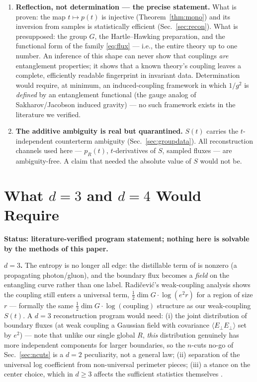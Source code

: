 \documentclass[11pt]{article}
\theoremstyle{remark}
\theoremstyle{plain}
\newcommand{\dG}{\dim G}
\begin{document}
\begin{enumerate}
\item \textbf{Reflection, not determination --- the precise statement.} What is proven: the map $t \mapsto p(t)$ is injective (Theorem~\ref{thm:mono}) and its inversion from samples is statistically efficient (Sec.~\ref{sec:recon}). What is presupposed: the group $G$, the Hartle--Hawking preparation, and the functional form of the family \eqref{eq:flux} --- i.e., the entire theory up to one number. An inference of this shape can never show that couplings \emph{are} entanglement properties; it shows that a known theory's coupling leaves a complete, efficiently readable fingerprint in invariant data. Determination would require, at minimum, an induced-coupling framework in which $1/g^2$ is \emph{defined} by an entanglement functional (the gauge analog of Sakharov/Jacobson induced gravity) --- no such framework exists in the literature we verified.

\item \textbf{The additive ambiguity is real but quarantined.} $S(t)$ carries the $t$-independent counterterm ambiguity (Sec.~\ref{sec:groupdata}). All reconstruction channels used here --- $p_R(t)$, $t$-derivatives of $S$, sampled fluxes --- are ambiguity-free. A claim that needed the absolute value of $S$ would not be.

\end{enumerate}

\section{What \texorpdfstring{$d = 3$ and $d = 4$}{d = 3 and d = 4} Would Require}\label{sec:d34}

\textbf{Status: literature-verified program statement; nothing here is solvable by the methods of this paper.}

\textbf{$d = 3$.} The entropy is no longer all edge: the distillable term of \cite{D11} is nonzero (a propagating photon/gluon), and the boundary flux becomes a \emph{field} on the entangling curve rather than one label. Radi\v{c}evi\'c's weak-coupling analysis \cite{R15} shows the coupling still enters a universal term, $\tfrac12\dG\cdot\log(e^2 r)$ for a region of size $r$ --- formally the same $\tfrac12\dG\cdot\log(\text{coupling})$ structure as our weak-coupling $S(t)$. A $d = 3$ reconstruction program would need: (i) the joint distribution of boundary fluxes (at weak coupling a Gaussian field with covariance $\langle E_\perp E_\perp\rangle$ set by $e^2$) --- note that unlike our single global $R$, \emph{this} distribution genuinely has more independent components for larger boundaries, so the $n$-cuts no-go of Sec.~\ref{sec:ncuts} is a $d = 2$ peculiarity, not a general law; (ii) separation of the universal log coefficient from non-universal perimeter pieces; (iii) a stance on the center choice, which in $d \geq 3$ affects the sufficient statistics themselves \cite{CHR}.
\end{document}

